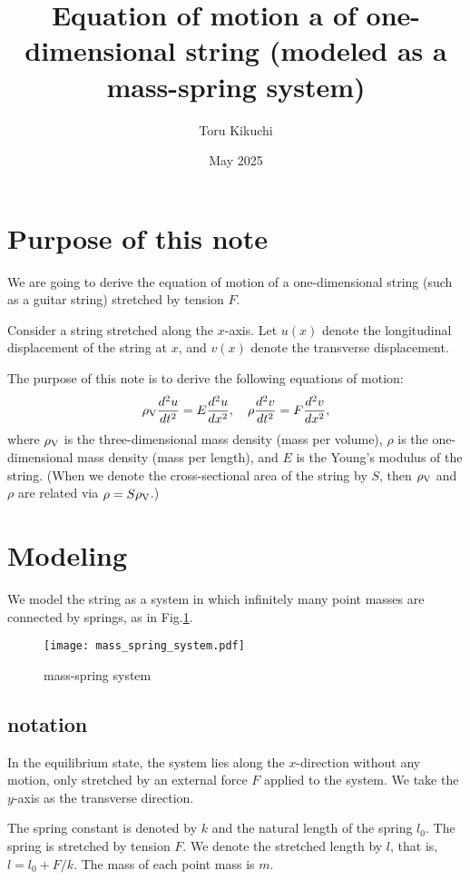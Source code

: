\documentclass{article}
\title{Equation of motion a of one-dimensional string (modeled as a mass-spring system)}
\author{Toru Kikuchi}
\date{May 2025}
\begin{document}
\maketitle

\section{Purpose of this note}

We are going to derive the equation of motion of a one-dimensional string (such as a guitar string) stretched by tension $F$. 

Consider a string stretched along the $x$-axis.
Let $u(x)$ denote the longitudinal displacement of the string at $x$, and $v(x)$ denote the transverse displacement.   

The purpose of this note is to derive the following equations of motion:
\begin{align}
\rho_{\rm V} \frac{d^2u}{dt^2} = E\frac{d^2u}{dx^2}, \quad \rho \frac{d^2v}{dt^2} = F\frac{d^2v}{dx^2},
\end{align}
where $\rho_{\rm V}$ is the three-dimensional mass density (mass per volume), $\rho$ is the one-dimensional mass density (mass per length), and $E$ is the Young's modulus of the string.  (When we denote the cross-sectional area of the string by $S$, then $\rho_{\rm V}$ and $\rho$ are related via $\rho=S\rho_{\rm V}$.) 


\section{Modeling}
We model the string as a system in which infinitely many point masses are connected by springs, as in Fig.\ref{fig:mass-spring system}. 

\begin{figure}
    \centering
    \texttt{[image: mass\_spring\_system.pdf]}
    \caption{mass-spring system}
    \label{fig:mass-spring system}
\end{figure}

\subsection{notation}
In the equilibrium state, the system lies along the $x$-direction without any motion, only stretched by an external force $F$ applied to the system.  
We take the $y$-axis as the transverse direction.  

The spring constant is denoted by $k$ and the natural length of the spring $l_0$. The spring is stretched by tension $F$.  We denote the stretched length by $l$, that is, $l=l_0 + F/k$.  The mass of each point mass is $m$.
\end{document}
